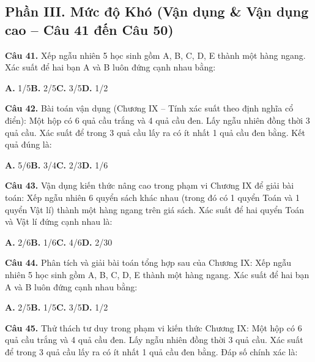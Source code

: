 \documentclass[11pt,a4paper]{article}
\begin{document}
\subsection*{\color{accent} Phần III. Mức độ Khó (Vận dụng \& Vận dụng cao -- Câu 41 đến Câu 50)}
\textbf{\color{primary} Câu 41.} Xếp ngẫu nhiên 5 học sinh gồm A, B, C, D, E thành một hàng ngang. Xác suất để hai bạn A và B luôn đứng cạnh nhau bằng:\par
\hspace*{1.5em}\textbf{A.} 1/5\quad\quad \textbf{B.} 2/5\quad\quad \textbf{C.} 3/5\quad\quad \textbf{D.} 1/2\par\vspace{2pt}
\textbf{\color{primary} Câu 42.} Bài toán vận dụng (Chương IX – Tính xác suất theo định nghĩa cổ điển): Một hộp có 6 quả cầu trắng và 4 quả cầu đen. Lấy ngẫu nhiên đồng thời 3 quả cầu. Xác suất để trong 3 quả cầu lấy ra có ít nhất 1 quả cầu đen bằng. Kết quả đúng là:\par
\hspace*{1.5em}\textbf{A.} 5/6\quad\quad \textbf{B.} 3/4\quad\quad \textbf{C.} 2/3\quad\quad \textbf{D.} 1/6\par\vspace{2pt}
\textbf{\color{primary} Câu 43.} Vận dụng kiến thức nâng cao trong phạm vi Chương IX để giải bài toán: Xếp ngẫu nhiên 6 quyển sách khác nhau (trong đó có 1 quyển Toán và 1 quyển Vật lí) thành một hàng ngang trên giá sách. Xác suất để hai quyển Toán và Vật lí đứng cạnh nhau là:\par
\hspace*{1.5em}\textbf{A.} 2/6\quad\quad \textbf{B.} 1/6\quad\quad \textbf{C.} 4/6\quad\quad \textbf{D.} 2/30\par\vspace{2pt}
\textbf{\color{primary} Câu 44.} Phân tích và giải bài toán tổng hợp sau của Chương IX: Xếp ngẫu nhiên 5 học sinh gồm A, B, C, D, E thành một hàng ngang. Xác suất để hai bạn A và B luôn đứng cạnh nhau bằng:\par
\hspace*{1.5em}\textbf{A.} 2/5\quad\quad \textbf{B.} 1/5\quad\quad \textbf{C.} 3/5\quad\quad \textbf{D.} 1/2\par\vspace{2pt}
\textbf{\color{primary} Câu 45.} Thử thách tư duy trong phạm vi kiến thức Chương IX: Một hộp có 6 quả cầu trắng và 4 quả cầu đen. Lấy ngẫu nhiên đồng thời 3 quả cầu. Xác suất để trong 3 quả cầu lấy ra có ít nhất 1 quả cầu đen bằng. Đáp số chính xác là:\par
\end{document}
